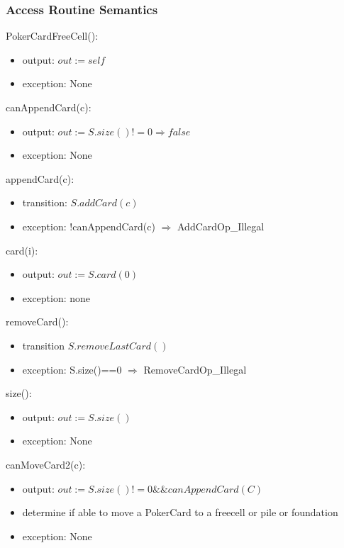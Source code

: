 \documentclass[12pt]{article}
\begin{document}
\subsubsection* {Access Routine Semantics}

PokerCardFreeCell():
\begin{itemize}
\item output: $out := \mathit{self}$
\item exception: None
\end{itemize}

\noindent canAppendCard(c):
\begin{itemize}
\item output: $out := S.size()!=0 \Rightarrow false$
\item exception: None
\end{itemize}

\noindent appendCard(c):
\begin{itemize}
\item transition: $S.addCard(c)$
\item exception: !canAppendCard(c) $\Rightarrow$ AddCardOp\_Illegal
\end{itemize}

\noindent card(i):
\begin{itemize}
\item output: $out := S.card(0)$
\item exception: none
\end{itemize}

\noindent removeCard():
\begin{itemize}
\item transition $S.removeLastCard()$
\item exception: S.size()==0 $\Rightarrow$ RemoveCardOp\_Illegal
\end{itemize}

\noindent size():
\begin{itemize}
\item output: $out := S.size()$
\item exception: None
\end{itemize}

\noindent canMoveCard2(c):
\begin{itemize}
\item output: $out := S.size()!=0 \&\& canAppendCard(C)$
\item determine if able to move a PokerCard to a freecell or pile or foundation
\item exception: None
\end{itemize}
\end{document}
